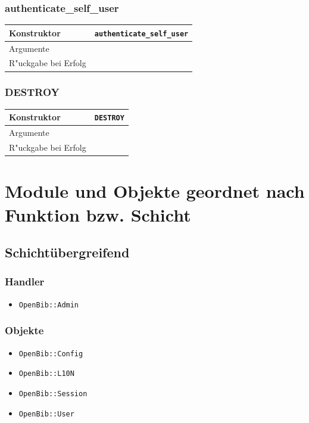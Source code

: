 \documentclass[11pt, twoside, a4paper, BCOR8mm, DIV12, bibtotoc,idxtotoc]{scrbook}
\begin{document}
\subsection{authenticate\_self\_user}
\begin{shadowenv}
\begin{tabular}{lp{10cm}}
  Konstruktor & \texttt{authenticate\_self\_user}\\
  \hline
  Argumente     & \\
  R"uckgabe bei Erfolg & \\
\end{tabular}
\end{shadowenv}

\subsection{DESTROY}
\begin{shadowenv}
\begin{tabular}{lp{10cm}}
  Konstruktor & \texttt{DESTROY}\\
  \hline
  Argumente     & \\
  R"uckgabe bei Erfolg & \\
\end{tabular}
\end{shadowenv}

\chapter{Module und Objekte geordnet nach Funktion bzw. Schicht}

\section{Schichtübergreifend}


\subsection{Handler}
\begin{itemize}
\item \texttt{OpenBib::Admin}
\end{itemize}

\subsection{Objekte}
\begin{itemize}
\item \texttt{OpenBib::Config}
\item \texttt{OpenBib::L10N}
\item \texttt{OpenBib::Session}
\item \texttt{OpenBib::User}
\end{itemize}
\end{document}
